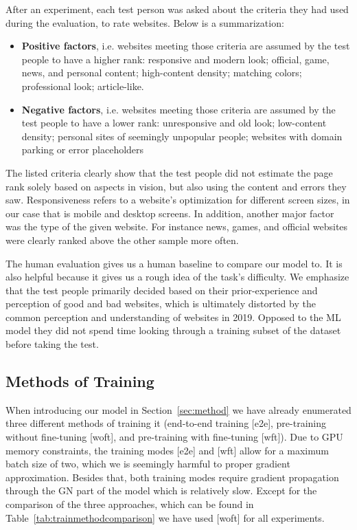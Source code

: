 After an experiment, each test person was asked about the criteria they had used during the evaluation, to rate websites. Below is a summarization:

\begin{itemize}
	\item \textbf{Positive factors}, i.e. websites meeting those criteria are assumed by the test people to have a higher rank: responsive and modern look; official, game, news, and personal content; high-content density; matching colors; professional look; article-like.
	\item \textbf{Negative factors}, i.e. websites meeting those criteria are assumed by the test people to have a lower rank: unresponsive and old look; low-content density; personal sites of seemingly unpopular people; websites with domain parking or error placeholders
\end{itemize}

The listed criteria clearly show that the test people did not estimate the page rank solely based on aspects in vision, but also using the content and errors they saw. Responsiveness refers to a website's optimization for different screen sizes, in our case that is mobile and desktop screens. In addition, another major factor was the type of the given website. For instance news, games, and official websites were clearly ranked above the other sample more often.

The human evaluation gives us a human baseline to compare our model to. It is also helpful because it gives us a rough idea of the task's difficulty. We emphasize that the test people primarily decided based on their prior-experience and perception of good and bad websites, which is ultimately distorted by the common perception and understanding of websites in 2019. Opposed to the ML model they did not spend time looking through a training subset of the dataset before taking the test.

\subsection{Methods of Training}

When introducing our model in Section~\ref{sec:method} we have already enumerated three different methods of training it (end-to-end training [e2e], pre-training without fine-tuning [woft], and pre-training with fine-tuning [wft]). Due to GPU memory constraints, the training modes [e2e] and [wft] allow for a maximum batch size of two, which we is seemingly harmful to proper gradient approximation. Besides that, both training modes require gradient propagation through the GN part of the model which is relatively slow. Except for the comparison of the three approaches, which can be found in Table~\ref{tab:trainmethodcomparison} we have used [woft] for all experiments.

